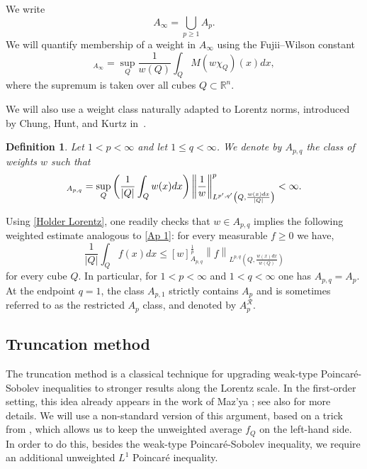 \documentclass[reqno, 10pt, oneside]{amsart}
\numberwithin{equation}{section}
\newcommand{\strt}[1]{\rule{0pt}{#1}}
\newtheorem{definition}[theorem]{Definition}
\numberwithin{theorem}{section}
\newcommand{\R}{{\mathbb R}}
\newcommand{\1}{{\rm 1\hspace*{-0.4ex}%
\rule{0.1ex}{1.52ex}\hspace*{0.2ex}}}
\begin{document}
We write
\begin{equation*}
	A_\infty = \bigcup_{p\ge 1} A_p.
\end{equation*}
We will quantify membership of a weight in $A_\infty$ using the Fujii--Wilson constant
\begin{equation*}
	[w]_{A_\infty} = \sup_Q \frac{1}{w(Q)} \int_Q M(w\chi_Q)(x)dx,
\end{equation*}
where the supremum is taken over all cubes $Q\subset\R^n$.

We will also use a weight class naturally adapted to Lorentz norms, introduced by Chung, Hunt, and Kurtz in~\cite{CHK}.

\begin{definition}\label{def:CHK}
	Let $1<p<\infty$ and let $1\le q <\infty$. We denote by $A_{p,q}$ the class of weights $w$ such that
	\begin{equation*}
		[w]_{A_{p,q}}= \sup_Q \left( \frac{1}{|Q|}\int_Q w(x)dx \right) \left\| \frac{1}{w}\right\|_{\strt{2.3ex} L^{p',q'} \left( Q, \frac{w(x)dx}{|Q|}\right)}^p<\infty.
	\end{equation*}
\end{definition}
Using \eqref{Holder Lorentz}, one readily checks that $w\in A_{p,q}$ implies the following weighted estimate analogous to \eqref{Ap 1}: for every measurable $f\ge 0$ we have,
\begin{equation}\label{Apq}
	\frac{1}{|Q|}\int_Q f(x)dx \le [w]^\frac{1}{p}_{A_{p,q}} \left\| f \right\|_{L^{p,q} \left( Q, \frac{w(x)dx}{w(Q)}\right)}
\end{equation}
for every cube $Q$. In particular, for $1<p<\infty$ and $1<q<\infty$ one has $A_{p,q}=A_p$. At the endpoint $q=1$, the class $A_{p,1}$ strictly contains $A_p$ and is sometimes referred to as the restricted $A_p$ class, and denoted by $A_p^\mathcal R$.





\subsection{Truncation method}

The truncation method is a classical technique for upgrading weak-type Poincaré-Sobolev inequalities to stronger results along the Lorentz scale. In the first-order setting, this idea already appears in the work of Maz'ya \cite[p. 110]{Mazya}; see also \cite{Hajlasz, KO03} for more details. We will use a non-standard version of this argument, based on a trick from \cite{FPW98}, which allows us to keep the unweighted average $f_Q$ on the left-hand side. In order to do this, besides the weak-type Poincaré-Sobolev inequality, we require an additional unweighted $L^1$ Poincaré inequality.
\end{document}
